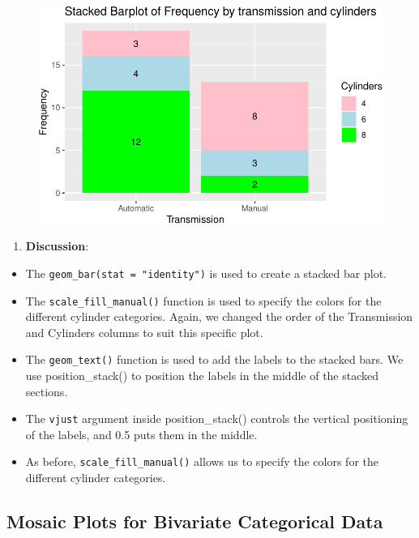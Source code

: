 \documentclass[
  letterpaper,
  DIV=11,
  numbers=noendperiod]{scrreport}
\providecommand{\tightlist}{%
  \setlength{\itemsep}{0pt}\setlength{\parskip}{0pt}}\usepackage{longtable,booktabs,array}
\begin{document}
\begin{figure}[H]

{\centering \includegraphics{08CategoricalData02_files/figure-pdf/unnamed-chunk-24-1.pdf}

}

\end{figure}

\begin{enumerate}
\def\labelenumi{\arabic{enumi}.}
\setcounter{enumi}{7}
\tightlist
\item
  \textbf{Discussion}:
\end{enumerate}

\begin{itemize}
\item
  The \texttt{geom\_bar(stat\ =\ "identity")} is used to create a
  stacked bar plot.
\item
  The \texttt{scale\_fill\_manual()} function is used to specify the
  colors for the different cylinder categories. Again, we changed the
  order of the Transmission and Cylinders columns to suit this specific
  plot.
\item
  The \texttt{geom\_text()} function is used to add the labels to the
  stacked bars. We use position\_stack() to position the labels in the
  middle of the stacked sections.
\item
  The \texttt{vjust} argument inside position\_stack() controls the
  vertical positioning of the labels, and 0.5 puts them in the middle.
\item
  As before, \texttt{scale\_fill\_manual()} allows us to specify the
  colors for the different cylinder categories.
\end{itemize}

\hypertarget{mosaic-plots-for-bivariate-categorical-data}{%
\subsection{\texorpdfstring{\textbf{Mosaic Plots} for Bivariate
Categorical
Data}{Mosaic Plots for Bivariate Categorical Data}}\label{mosaic-plots-for-bivariate-categorical-data}}
\end{document}
